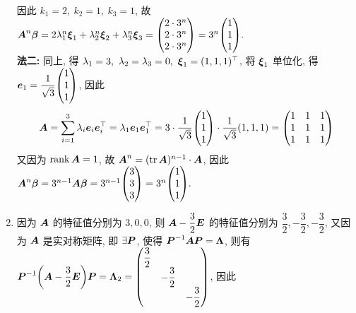 \begin{solution}
\begin{enumerate}[label=(\arabic{*})]
              因此 $k_1=2,~k_2=1,~k_3=1$, 故 $\vb*{A}^n\vb*{\beta}=2\lambda_1^n\vb*{\xi}_1+\lambda_2^n\vb*{\xi}_2+\lambda_3^n\vb*{\xi}_3=\mqty(2\cdot 3^n\\2\cdot 3^n\\2\cdot 3^n)=3^{n}\mqty(1\\1\\1).$\\
              \textbf{法二: }同上, 得 $\lambda_1=3,~\lambda_2=\lambda_3=0,~\vb*{\xi}_1=(1,1,1)^\top$, 将 $\vb*{\xi}_1$ 单位化, 得 $\vb*{e}_1=\dfrac{1}{\sqrt{3}}\mqty(1\\1\\1)$, 因此
              $$\vb*{A}=\sum_{i=1}^{3}\lambda_i\vb*{e}_i\vb*{e}_i^\top=\lambda_1\vb*{e}_1\vb*{e}_1^\top=3\cdot\dfrac{1}{\sqrt{3}}\mqty(1\\1\\1)\cdot\dfrac{1}{\sqrt{3}}(1,1,1)=\mqty(1&1&1\\1&1&1\\1&1&1)$$
              又因为 $\rank\vb*{A}=1$, 故 $\vb*{A}^n=(\tr\vb*{A})^{n-1}\cdot\vb*{A}$, 因此 $\vb*{A}^n\vb*{\beta}=3^{n-1}\vb*{A\beta}=3^{n-1}\mqty(3\\3\\3)=3^{n}\mqty(1\\1\\1).$
        \item 因为 $\vb*{A}$ 的特征值分别为 $3,0,0$, 则 $\vb*{A}-\dfrac{3}{2}\vb*{E}$ 的特征值分别为 $\dfrac{3}{2},-\dfrac{3}{2},-\dfrac{3}{2}$, 又因为 $\vb*{A}$ 是实对称矩阵, 即 $\exists\vb*{P}$, 使得 $\vb*{P}^{-1}\vb*{AP}=\vb*{\Lambda}$, 则有
              $\vb*{P}^{-1}\qty(\vb*{A}-\dfrac{3}{2}\vb*{E})\vb*{P}=\vb*{\Lambda}_2=\mqty(\dfrac{3}{2}\\&-\dfrac{3}{2}\\&&-\dfrac{3}{2})$, 因此
    \end{enumerate}
\end{solution}

